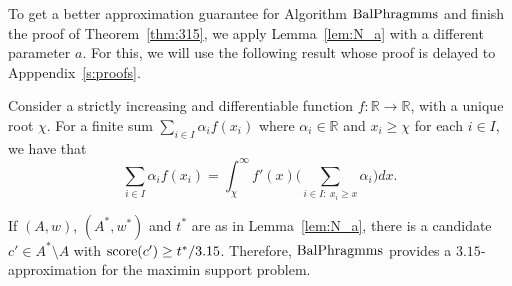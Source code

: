 To get a better approximation guarantee for Algorithm $\operatorname{BalPhragmms}$ and finish the proof of Theorem~\ref{thm:315}, we apply Lemma~\ref{lem:N_a} with a different parameter $a$. For this, we will use the following result whose proof is delayed to Apppendix~\ref{s:proofs}.

\begin{lemma}\label{lem:Lebesgue}
Consider a strictly increasing and differentiable function $f:\mathbb{R}\rightarrow \mathbb{R}$, with a unique root $\chi$. For a finite sum $\sum_{i\in I} \alpha_i f(x_i)$ where $\alpha_i\in\mathbb{R}$ and $ x_i\geq \chi$ for each $i\in I$, we have that
$$\sum_{i\in I} \alpha_i f(x_i) = \int_{\chi}^{\infty} f'(x) \big(\sum_{i\in I: \ x_i\geq x} \alpha_i\big)dx.$$
\end{lemma}

\begin{lemma}\label{lem:candidate315}
If $(A,w)$, $(A^*,w^*)$ and $t^*$ are as in Lemma~\ref{lem:N_a}, there is a candidate $c'\in A^*\setminus A$ with $\operatorname{score}(c')\geq t^*/3.15$. Therefore, $\operatorname{BalPhragmms}$ provides a $3.15$-approximation for the maximin support problem.
\end{lemma}

